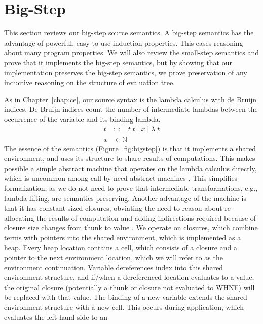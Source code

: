 \section{Big-Step \ce} \label{sec:cem_big}

This section reviews our big-step source semantics. A big-step semantics
has the advantage of powerful, easy-to-use induction properties. This eases
reasoning about many program properties. We will also review the small-step
semantics and prove that it implements the big-step semantics, but by showing
that our implementation preserves the big-step semantics, we prove preservation
of any inductive reasoning on the structure of evaluation tree.  

As in Chapter~\ref{chap:ce}, our source syntax is the lambda calculus with de
Bruijn indices. De Bruijn indices count the number of intermediate lambdas
between the occurrence of the variable and its binding lambda.  
\begin{align*}
 t &::= t \; t \; | \; x \; | \;  \lambda \; t \\
 x &\in \mathbb{N}
\end{align*}
The essence of the \ce semantics (Figure~\ref{fig:bigstep}) is that it
implements a shared environment, and uses its structure to share results of
computations. This makes possible a simple abstract machine that operates on the
lambda calculus directly, which is uncommon among call-by-need abstract machines
\cite{jonesstg,launchburynatural,TIM,johnsson1984efficient}. This simplifies
formalization, as we do not need to prove that intermediate transformations,
e.g., lambda lifting, are semantics-preserving. Another advantage of the \ce
machine is that it has constant-sized closures, obviating the need to reason
about re-allocating the results of computation and adding indirections required
because of closure size changes from thunk to value \cite{jonesstg}. We operate
on closures, which combine terms with pointers into the shared environment,
which is implemented as a heap. Every heap location contains a cell, which
consists of a closure and a pointer to the next environment location, which we
will refer to as the environment continuation.  Variable dereferences index into
this shared environment structure, and if/when a dereferenced location evaluates
to a value, the original closure (potentially a thunk or closure not evaluated
to WHNF) will be replaced with that value. The binding of a new variable extends
the shared environment structure with a new
cell. This occurs during application, which evaluates the left hand side to an

